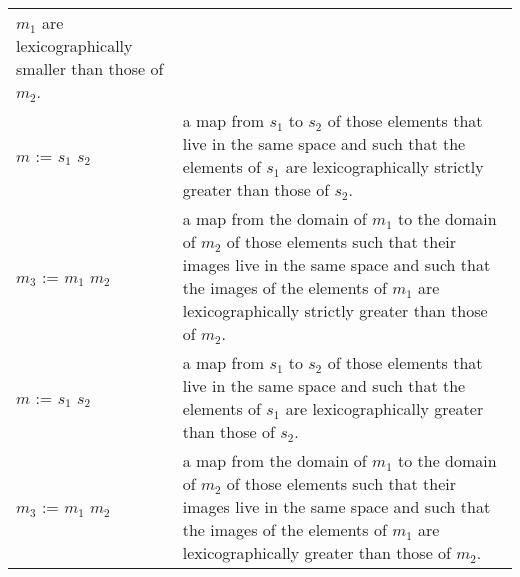 \begin{supertabular}{p{0.35\textwidth}p{0.6\textwidth}}
$m_1$ are lexicographically smaller than those of $m_2$.
\\
$m$ := $s_1$ \ai[\tt]{>>} $s_2$ & a map from
$s_1$ to $s_2$ of those elements that live in the same space and
such that the elements of $s_1$ are lexicographically strictly greater
than those of $s_2$.
\\
$m_3$ := $m_1$ \ai[\tt]{>>} $m_2$ & a map from the domain of
$m_1$ to the domain of $m_2$ of those elements such that their images
live in the same space and such that the images of the elements of
$m_1$ are lexicographically strictly greater than those of $m_2$.
\\
$m$ := $s_1$ \ai[\tt]{>>=} $s_2$ & a map from
$s_1$ to $s_2$ of those elements that live in the same space and
such that the elements of $s_1$ are lexicographically greater
than those of $s_2$.
\\
$m_3$ := $m_1$ \ai[\tt]{>>=} $m_2$ & a map from the domain of
$m_1$ to the domain of $m_2$ of those elements such that their images
live in the same space and such that the images of the elements of
$m_1$ are lexicographically greater than those of $m_2$.
\\
\end{supertabular}
